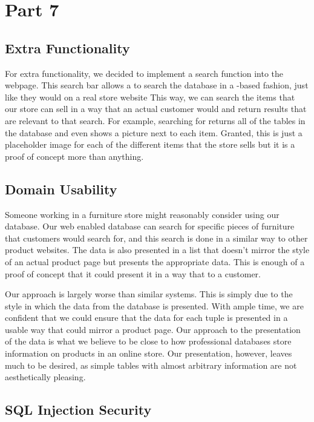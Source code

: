 \documentclass[american,extrafontsizes,12pt,portrait,letterpaper,oneside,onecolumn,final]{memoir}
\begin{document}
\chapter{Part 7}

\section{Extra Functionality}

For extra functionality, we decided to implement a search function into the webpage.
This search bar allows a  to search the database in a \hyp based fashion, just like they would on a real store website
This way, we can search the items that our store can sell in a way that an actual customer would and return results that are relevant to that search.
For example, searching for  returns all of the tables in the database and even shows a picture next to each item.
Granted, this is just a placeholder image for each of the different items that the store sells but it is a proof of concept more than anything.

\section{Domain Usability}

Someone working in a furniture store might reasonably consider using our database.
Our web enabled database can search for specific pieces of furniture that customers would search for, and this search is done in a similar way to other product websites.
The data is also presented in a list that doesn't mirror the style of an actual product page but presents the appropriate data.
This is enough of a proof of concept that it could present it in a way that  to a customer.

Our approach is largely worse than similar systems.
This is simply due to the style in which the data from the database is presented.
With ample time, we are confident that we could ensure that the data for each tuple is presented in a usable way that could mirror a product page.
Our approach to the presentation of the data is what we believe to be close to how professional databases store information on products in an online store. Our presentation, however, leaves much to be desired, as simple tables with almost arbitrary information are not aesthetically pleasing.

\section{SQL Injection Security}
\end{document}
